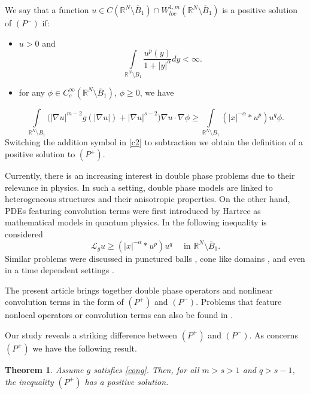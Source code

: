 \documentclass[leqno,12pt]{article}
\numberwithin{equation}{section}
\newcommand{\R}{\mathbb R}
\newcommand{\Ro}{\mathbb R^N\setminus \overline B_1}
\newcommand{\Lg}{{\mathcal L}_g}
\newtheorem{theorem}{Theorem}[section]
\begin{document}
We say that a function $u\in C(\Ro)\cap W_{loc}^{1, m}(\Ro)$ is a positive  solution of $(P^-)$ if:
\begin{itemize}
\item $u>0$ and
\begin{equation}\label{c1}
\int\limits_{\R^N\setminus B_1}\frac{u^{p}(y)}{1+|y|^{\alpha}}dy< \infty.
\end{equation}
\smallskip

\item for any $\phi \in C_{c}^{\infty}(\Ro)$, $\phi\geq 0$, we have
\end{itemize}
\begin{equation}\label{c2}
\int\limits_{\R^N\setminus B_1} \Big(|\nabla u|^{m-2}g(|\nabla u|)+|\nabla u|^{s-2}\Big) \nabla u\cdot \nabla \phi \geq \int\limits_{\R^N\setminus B_1} (|x|^{-\alpha}*u^p)u^q \phi.
\end{equation}
Switching the addition symbol in \eqref{c2} to subtraction  we obtain the definition of a positive solution to $(P^+)$.

Currently, there is an increasing interest in double phase problems \cite{CJJ26, CPR26, TZ26, WS25, Z26, ZLP25} due to their relevance in physics. In such a setting, double phase models are linked to heterogeneous structures and their anisotropic properties. On the other hand, PDEs featuring convolution terms were first introduced by Hartree \cite{Har28a, Har28b, Har28c} as mathematical models in quantum physics. In \cite{GKS20} the following inequality is considered
$$
\Lg u\geq (|x|^{-\alpha}*u^p)u^q\quad\mbox{ in }\R^N\setminus \overline B_1.
$$
Similar problems were discussed in punctured balls \cite{FG20, GZ26}, cone like domains \cite{GZ23},  and even in a time dependent settings \cite{FG22a, FG22b}.

The present article brings together double phase operators and nonlinear convolution terms in the form of $(P^+)$ and $(P^-)$. Problems that feature nonlocal operators or convolution terms can also be found in \cite{LR26, MNV24, NS26}.




 
Our study reveals a striking difference between $(P^+)$ and $(P^-)$. As concerns $(P^+)$ we have the following result.

\begin{theorem}\label{tp}
Assume $g$ satisfies \eqref{cong}. Then, for all $m>s>1$ and $q>s-1$, the inequality $(P^+)$ has a positive solution. 
\end{theorem}
\end{document}
